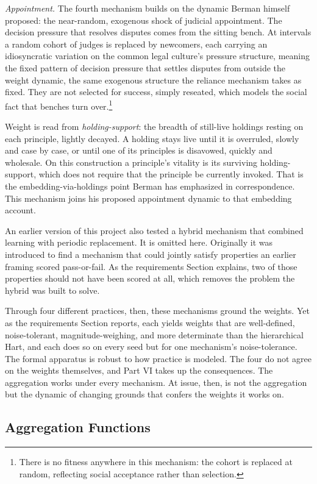 \textit{Appointment.} The fourth mechanism builds on the dynamic Berman himself proposed: the
near-random, exogenous shock of judicial appointment. The decision pressure that resolves disputes comes from the sitting bench.
At intervals a random cohort of judges is replaced by newcomers, each carrying
an idiosyncratic variation on the common legal culture's pressure structure,
meaning the fixed pattern of decision pressure that settles disputes from
outside the weight dynamic, the same exogenous structure the reliance
mechanism takes as fixed.
They are not selected for success, simply reseated,
which models the social fact that benches turn over.\footnote{There is no fitness
anywhere in this mechanism: the cohort is replaced at random, reflecting
social acceptance rather than selection.}

Weight is read from \textit{holding-support}: the breadth of still-live
holdings resting on each principle, lightly decayed. A holding stays live
until it is overruled, slowly and case by case, or until one of its
principles is disavowed, quickly and wholesale. On this construction a
principle's vitality is its surviving holding-support, which does not
require that the principle be currently invoked. That is the embedding-via-holdings point Berman has emphasized in correspondence. This
mechanism joins his proposed appointment dynamic to that embedding account.

An earlier version of this project also tested a hybrid mechanism that
combined learning with periodic replacement. It is omitted here. Originally it was introduced to find a mechanism that could jointly satisfy
properties an earlier framing scored pass-or-fail. As the requirements Section explains, two of those properties should not
have been scored at all, which
removes the problem the hybrid was built to solve.

Through four different practices, then, these mechanisms ground the
weights. Yet as the requirements Section reports, each yields weights that are
well-defined, noise-tolerant, magnitude-weighing, and more determinate than the
hierarchical Hart, and each does so on every seed but for one mechanism's
noise-tolerance. The formal apparatus is robust to how practice is modeled.
The four do not agree on the weights themselves, and Part VI takes
up the consequences. The aggregation works under every mechanism. At issue,
then, is not the aggregation but the dynamic of changing grounds that
confers the weights it works on.

\subsection{Aggregation Functions}

